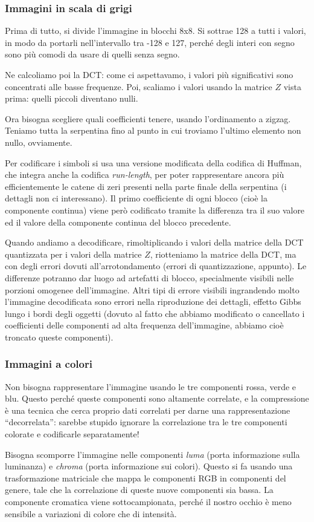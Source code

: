 \documentclass[a4paper,11pt]{article}
\begin{document}
\subsubsection{Immagini in scala di grigi}
Prima di tutto, si divide l'immagine in blocchi 8x8. Si sottrae 128 a tutti i valori, in modo da portarli nell'intervallo tra -128 e 127, perché degli interi con segno sono più
comodi da usare di quelli senza segno.
\par
Ne calcoliamo poi la DCT: come ci aspettavamo, i valori più significativi sono concentrati alle basse frequenze. Poi, scaliamo i valori usando la matrice $Z$ vista prima: quelli piccoli diventano nulli.
\par
Ora bisogna scegliere quali coefficienti tenere, usando l'ordinamento a zigzag. Teniamo tutta la serpentina fino al punto in cui troviamo l'ultimo elemento non nullo, ovviamente.
\par
Per codificare i simboli si usa una versione modificata della codifica di Huffman, che integra anche la codifica \textit{run-length}, per poter rappresentare ancora più efficientemente
le catene di zeri presenti nella parte finale della serpentina (i dettagli non ci interessano). Il primo coefficiente di ogni blocco (cioè la componente continua) viene però codificato tramite
la differenza tra il suo valore ed il valore della componente continua del blocco precedente.
\par
Quando andiamo a decodificare, rimoltiplicando i valori della matrice della DCT quantizzata per i valori della matrice $Z$, riotteniamo la matrice della DCT, ma con degli errori dovuti all'arrotondamento
(errori di quantizzazione, appunto). Le differenze potranno dar luogo ad artefatti di blocco, specialmente visibili nelle porzioni omogenee dell'immagine.
Altri tipi di errore visibili ingrandendo molto l'immagine decodificata sono errori nella riproduzione dei dettagli, effetto Gibbs lungo i bordi degli oggetti (dovuto al fatto che abbiamo modificato
o cancellato i coefficienti delle componenti ad alta frequenza dell'immagine, abbiamo cioè troncato queste componenti).

\subsubsection{Immagini a colori}
Non bisogna rappresentare l'immagine usando le tre componenti rossa, verde e blu. Questo perché queste componenti sono altamente correlate, e la compressione è una tecnica che cerca proprio
dati correlati per darne una rappresentazione ``decorrelata'': sarebbe stupido ignorare la correlazione tra le tre componenti colorate e codificarle separatamente!
\par
Bisogna scomporre l'immagine nelle componenti \textit{luma} (porta informazione sulla luminanza) e \textit{chroma} (porta informazione sui colori). Questo si fa usando una
trasformazione matriciale che mappa le componenti RGB in componenti del genere, tale che la correlazione di queste nuove componenti sia bassa.
La componente cromatica viene sottocampionata, perché il nostro occhio è meno sensibile a variazioni di colore che di intensità.
\end{document}

